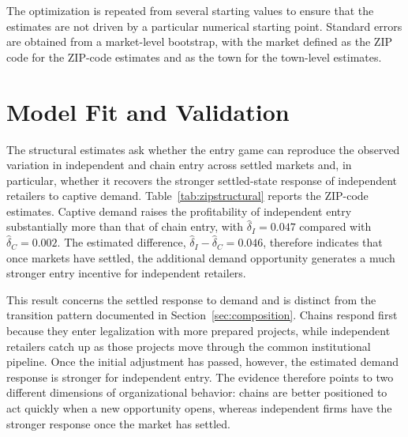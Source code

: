 \documentclass[english,12pt]{article}
\begin{document}
The optimization is repeated from several starting values to ensure that the estimates are not driven by a particular numerical starting point. Standard errors are obtained from a market-level bootstrap, with the market defined as the ZIP code for the ZIP-code estimates and as the town for the town-level estimates.

\section{Model Fit and Validation}
\label{sec:modelfit}

The structural estimates ask whether the entry game can reproduce the observed variation in independent and chain entry across settled markets and, in particular, whether it recovers the stronger settled-state response of independent retailers to captive demand. Table~\ref{tab:zipstructural} reports the ZIP-code estimates. Captive demand raises the profitability of independent entry substantially more than that of chain entry, with $\hat\delta_I=0.047$ compared with $\hat\delta_C=0.002$. The estimated difference, $\hat\delta_I-\hat\delta_C=0.046$, therefore indicates that once markets have settled, the additional demand opportunity generates a much stronger entry incentive for independent retailers.

This result concerns the settled response to demand and is distinct from the transition pattern documented in Section~\ref{sec:composition}. Chains respond first because they enter legalization with more prepared projects, while independent retailers catch up as those projects move through the common institutional pipeline. Once the initial adjustment has passed, however, the estimated demand response is stronger for independent entry. The evidence therefore points to two different dimensions of organizational behavior: chains are better positioned to act quickly when a new opportunity opens, whereas independent firms have the stronger response once the market has settled.

\begin{table}[htbp]
\centering
\footnotesize

\caption{Estimated restricted entry game, ZIP-code level, converged quarters. $\hat\delta_I$ and $\hat\delta_C$ are the type-specific profitability responses to captive cross-border demand in settled markets; $\gamma_{\text{same}}$ and $\gamma_{\text{other}}$ are the same-type and other-type competitive effects. Standard errors and 95\% intervals from ZIP-code-clustered bootstrap replications.}
\label{tab:zipstructural}
\end{table}
\end{document}

